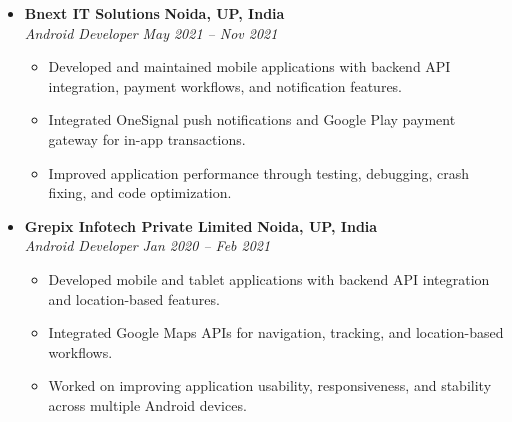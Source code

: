 \documentclass[11pt, a4paper]{article}
\begin{document}
\begin{itemize}[leftmargin=0pt, label={}, itemsep=0.8ex]
    \item
    \textbf{Bnext IT Solutions} \hfill \textbf{Noida, UP, India} \\
    \textit{Android Developer} \hfill \textit{May 2021 -- Nov 2021}
    \begin{itemize}[leftmargin=1.5em]
        \item Developed and maintained mobile applications with backend API integration, payment workflows, and notification features.
        \item Integrated OneSignal push notifications and Google Play payment gateway for in-app transactions.
        \item Improved application performance through testing, debugging, crash fixing, and code optimization.
    \end{itemize}

    \item
    \textbf{Grepix Infotech Private Limited} \hfill \textbf{Noida, UP, India} \\
    \textit{Android Developer} \hfill \textit{Jan 2020 -- Feb 2021}
    \begin{itemize}[leftmargin=1.5em]
        \item Developed mobile and tablet applications with backend API integration and location-based features.
        \item Integrated Google Maps APIs for navigation, tracking, and location-based workflows.
        \item Worked on improving application usability, responsiveness, and stability across multiple Android devices.
    \end{itemize}

\end{itemize}

\newpage

\end{document}
